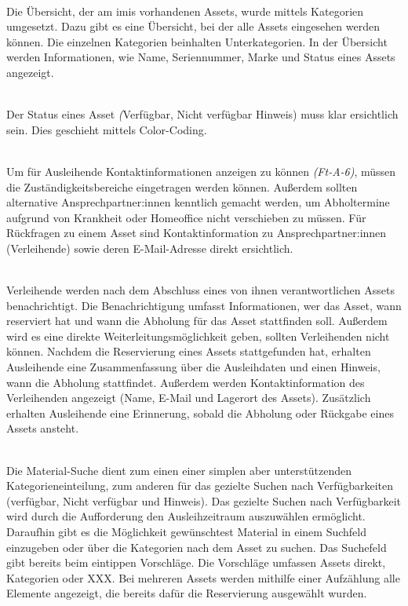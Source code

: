     {\sffamily\color{maincolor}{Ft-B-2 | Übersicht über ausleihbare Assets }}\\
Die Übersicht, der am \ac{imis} vorhandenen Assets, wurde mittels Kategorien umgesetzt. Dazu gibt es
eine Übersicht, bei der alle Assets eingesehen werden können. Die einzelnen Kategorien beinhalten
Unterkategorien. In der Übersicht werden Informationen, wie Name, Seriennummer, Marke und Status
eines Assets angezeigt.

    {\sffamily\color{maincolor}{Ft-B-3 |  Verfügbarkeit von Assets }}\\
Der Status eines Asset \textit(Verfügbar, Nicht verfügbar Hinweis) muss klar ersichtlich sein. Dies
geschieht mittels Color-Coding.  


{\sffamily\color{maincolor}{Ft-B-4 | Zuständigkeitsbereich }}\\
Um für Ausleihende Kontaktinformationen anzeigen zu können \textit{(Ft-A-6)}, müssen die
Zuständigkeitsbereiche eingetragen werden können. Außerdem sollten alternative Ansprechpartner:innen
kenntlich gemacht werden, um Abholtermine aufgrund von Krankheit oder Homeoffice nicht verschieben
zu müssen. Für Rückfragen zu einem Asset sind Kontaktinformation zu Ansprechpartner:innen
(Verleihende) sowie deren E-Mail-Adresse direkt ersichtlich.

{\sffamily\color{maincolor}{Ft-B-5 | Benachrichtigungen \& Erinnerungen }}\\
Verleihende werden nach dem Abschluss eines von ihnen verantwortlichen Assets benachrichtigt. Die
Benachrichtigung umfasst Informationen, wer das Asset, wann reserviert hat und wann die Abholung für
das Asset stattfinden soll. Außerdem wird es eine direkte Weiterleitungsmöglichkeit geben, sollten
Verleihenden nicht können. Nachdem die Reservierung eines Assets stattgefunden hat, erhalten
Ausleihende eine Zusammenfassung über die Ausleihdaten und einen Hinweis, wann die Abholung
stattfindet. Außerdem werden Kontaktinformation des Verleihenden angezeigt (Name, E-Mail und
Lagerort des Assets). Zusätzlich erhalten Ausleihende eine Erinnerung, sobald die Abholung oder
Rückgabe eines Assets ansteht.


    {\sffamily\color{maincolor}{Ft-B-6 | Material-Suche }}\\
Die Material-Suche dient zum einen einer simplen aber unterstützenden Kategorieneinteilung, zum
anderen für das gezielte Suchen nach Verfügbarkeiten (verfügbar, Nicht verfügbar und Hinweis). Das
gezielte Suchen nach Verfügbarkeit wird durch die Aufforderung den Ausleihzeitraum auszuwählen
ermöglicht. Daraufhin gibt es die Möglichkeit gewünschtest Material in einem Suchfeld einzugeben
oder über die Kategorien nach dem Asset zu suchen. Das Suchefeld gibt bereits beim eintippen
Vorschläge. Die Vorschläge umfassen Assets direkt, Kategorien oder XXX. Bei mehreren Assets werden
mithilfe einer Aufzählung alle Elemente angezeigt, die bereits dafür die Reservierung ausgewählt wurden.

